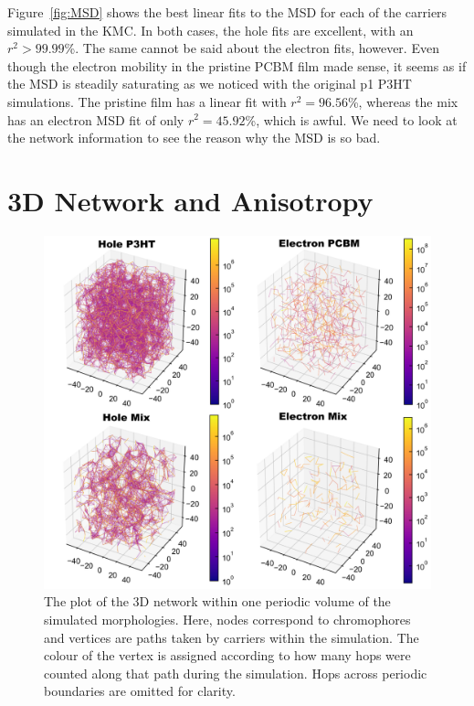 \documentclass[12pt]{article}
\begin{document}
Figure~\ref{fig:MSD} shows the best linear fits to the MSD for each of the carriers simulated in the KMC.
In both cases, the hole fits are excellent, with an $r^{2} > 99.99$\%.
The same cannot be said about the electron fits, however.
Even though the electron mobility in the pristine PCBM film made sense, it seems as if the MSD is steadily saturating as we noticed with the original p1 P3HT simulations.
The pristine film has a linear fit with $r^{2} = 96.56$\%, whereas the mix has an electron MSD fit of only $r^{2} = 45.92$\%, which is awful.
We need to look at the network information to see the reason why the MSD is so bad.


\clearpage

\section{3D Network and Anisotropy}


\begin{figure}[h!]\centering
	\includegraphics[width=\textwidth]{Figures/3DNetwork.pdf}
    \caption{The plot of the 3D network within one periodic volume of the simulated morphologies.
    Here, nodes correspond to chromophores and vertices are paths taken by carriers within the simulation.
    The colour of the vertex is assigned according to how many hops were counted along that path during the simulation.
    Hops across periodic boundaries are omitted for clarity.}
	\label{fig:network}
\end{figure}
\end{document}
